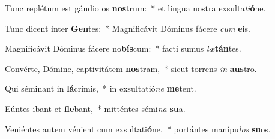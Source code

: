 \item Tunc replétum est gáudio os \textbf{nos}trum:~* et lingua nostra exsulta\textit{ti}\textbf{ó}ne.
\item Tunc dicent inter \textbf{Gen}tes:~* Magnificávit Dóminus fácere \textit{cum} \textbf{e}is.
\item Magnificávit Dóminus fácere no\textbf{bís}cum:~* facti sumus \textit{læ}\textbf{tán}tes.
\item Convérte, Dómine, captivitátem \textbf{nos}tram,~* sicut torrens \textit{in} \textbf{aus}tro.
\item Qui séminant in \textbf{lá}crimis,~* in exsultatió\textit{ne} \textbf{me}tent.
\item Eúntes ibant et \textbf{fle}bant,~* mitténtes sémi\textit{na} \textbf{su}a.
\item Veniéntes autem vénient cum exsultati\textbf{ó}ne,~* portántes manípu\textit{los} \textbf{su}os.
